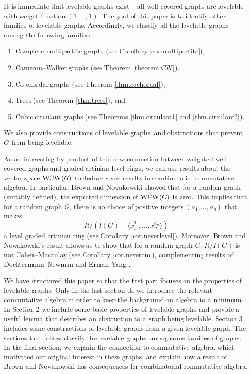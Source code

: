 \documentclass[12pt]{amsart}
\numberwithin{equation}{section}
\theoremstyle{definition}
\newcounter{i} %
\begin{document}
It is immediate that levelable graphs exist -- 
all well-covered graphs are levelable with weight function $(1,\ldots,1).$  The goal of this paper is to identify 
other families of levelable graphs.  
Accordingly, we 
classify all the levelable graphs among 
the following families:
\begin{enumerate}
    \item[$\bullet$] Complete multipartite graphs (see Corollary \ref{cor:multipartite}),
    \item[$\bullet$] Cameron--Walker graphs (see Theorem \ref{theorem:CW}),
    \item[$\bullet$] Co-chordal graphs (see Theorem \ref{thm.cochordal}),
    \item[$\bullet$] Trees (see Theorem \ref{thm.trees}), and
    \item[$\bullet$] Cubic circulant graphs (see Theorems \ref{thm.circulant1} and \ref{thm.circulant2}).
\end{enumerate}
We also provide constructions of levelable graphs,
and obstructions that prevent $G$ from being levelable.

As an interesting by-product of
this new connection between weighted well-covered graphs
and graded artinian level rings, we can use results
about the vector space ${\rm WCW}(G)$ to deduce some
results in combinatorial commutative algebra.  
In particular, Brown and Nowakowski \cite{BN2007}
showed that for a random graph (suitably defined),
the expected dimension of ${\rm WCW}(G)$ is zero.  
This implies that for a random graph $G$,
there is no choice of positive integers $(a_1,\ldots,a_n)$
that makes  \[R/(I(G)+\langle x_1^{a_1},\ldots,x_n^{a_n}\rangle)\]
a level graded artinian
ring (see Corollary \ref{cor.neverlevel}).  Moreover, 
Brown and Nowakowski's result allows us to show
that for a  random graph $G$, $R/I(G)$ is not
Cohen--Macaulay (see Corollary \ref{cor.nevercm}),
complementing results of 
Dochtermann--Newman \cite[Corollary 1.4]{DN2023} and
Erman-Yang \cite[Corollary 7.1]{EY2018}.  

We have structured this paper so that the
first part focuses on the properties of levelable graphs.  
Only in the last section do we introduce the relevant 
commutative algebra in order to keep the
background on algebra to a minimum.
In Section 2 we include some basic
properties of levelable graphs and provide 
a useful lemma that
describes an obstruction to a graph being levelable.  Section 3
includes some constructions of levelable graphs
from a given levelable graph.  
The sections that follow
classify the levelable graphs among some families of graphs.
In the final section, we explain the connection to 
commutative algebra, which motivated our 
original interest in these
graphs, and explain how a result
of Brown and Nowakowski has consequences for combinatorial 
commutative algebra.
\end{document}

